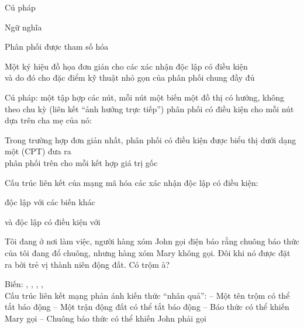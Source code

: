\documentclass{article}
\begin{document}
\begin{huge}

\sf


\blob Cú pháp

\blob Ngữ nghĩa

\blob Phân phối được tham số hóa




Một ký hiệu đồ họa đơn giản cho các xác nhận độc lập có điều kiện\\
và do đó cho đặc điểm kỹ thuật nhỏ gọn của phân phối chung đầy đủ

Cú pháp:\al
  một tập hợp các nút, mỗi nút một biến\al
  một đồ thị có hướng, không theo chu kỳ (liên kết \mat{$\approx$} ``ảnh hưởng trực tiếp'')\al
  phân phối có điều kiện cho mỗi nút dựa trên cha mẹ của nó:\nl

Trong trường hợp đơn giản nhất, phân phối có điều kiện được biểu thị dưới dạng \\
một  (CPT) đưa ra \\
phân phối trên  cho mỗi kết hợp giá trị gốc


Cấu trúc liên kết của mạng mã hóa các xác nhận độc lập có điều kiện:

\vspace*{0.3in}

\textwidth
{}

 độc lập với các biến khác

 và  độc lập có điều kiện với 



Tôi đang ở nơi làm việc, người hàng xóm John gọi điện báo rằng chuông báo thức của tôi đang đổ chuông, nhưng
hàng xóm Mary không gọi. Đôi khi nó được đặt ra bởi trẻ vị thành niên
động đất. Có trộm à?

Biến: , , , , \\
Cấu trúc liên kết mạng phản ánh kiến thức ``nhân quả'':\al
 -- Một tên trộm có thể tắt báo động\al
 -- Một trận động đất có thể tắt báo động\al
 -- Báo thức có thể khiến Mary gọi \al
 -- Chuông báo thức có thể khiến John phải gọi


\end{huge}
\end{document}
